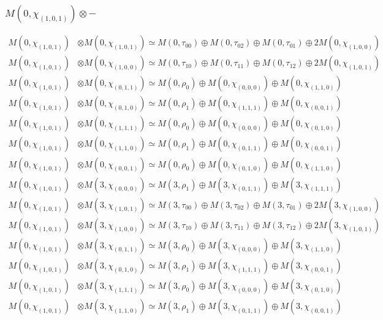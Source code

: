 \subsubsection{$ M(0,\chi_{(1,0,1)})\otimes -$}
\begin{align*}
M(0,\chi_{(1,0,1)}) &\otimes M(0,\chi_{(1,0,1)}) \simeq M(0,\tau_{00}) \oplus M(0,\tau_{02}) \oplus M(0,\tau_{01}) \oplus 2 M(0,\chi_{(1,0,0)})\\
M(0,\chi_{(1,0,1)}) &\otimes M(0,\chi_{(1,0,0)}) \simeq M(0,\tau_{10}) \oplus M(0,\tau_{11}) \oplus M(0,\tau_{12}) \oplus 2 M(0,\chi_{(1,0,1)})\\
M(0,\chi_{(1,0,1)}) &\otimes M(0,\chi_{(0,1,1)}) \simeq M(0,\rho_{0}) \oplus M(0,\chi_{(0,0,0)}) \oplus M(0,\chi_{(1,1,0)})\\
M(0,\chi_{(1,0,1)}) &\otimes M(0,\chi_{(0,1,0)}) \simeq M(0,\rho_{1}) \oplus M(0,\chi_{(1,1,1)}) \oplus M(0,\chi_{(0,0,1)})\\
M(0,\chi_{(1,0,1)}) &\otimes M(0,\chi_{(1,1,1)}) \simeq M(0,\rho_{0}) \oplus M(0,\chi_{(0,0,0)}) \oplus M(0,\chi_{(0,1,0)})\\
M(0,\chi_{(1,0,1)}) &\otimes M(0,\chi_{(1,1,0)}) \simeq M(0,\rho_{1}) \oplus M(0,\chi_{(0,1,1)}) \oplus M(0,\chi_{(0,0,1)})\\
M(0,\chi_{(1,0,1)}) &\otimes M(0,\chi_{(0,0,1)}) \simeq M(0,\rho_{0}) \oplus M(0,\chi_{(0,1,0)}) \oplus M(0,\chi_{(1,1,0)})\\
M(0,\chi_{(1,0,1)}) &\otimes M(3,\chi_{(0,0,0)}) \simeq M(3,\rho_{1}) \oplus M(3,\chi_{(0,1,1)}) \oplus M(3,\chi_{(1,1,1)})\\
M(0,\chi_{(1,0,1)}) &\otimes M(3,\chi_{(1,0,1)}) \simeq M(3,\tau_{00}) \oplus M(3,\tau_{02}) \oplus M(3,\tau_{01}) \oplus 2 M(3,\chi_{(1,0,0)})\\
M(0,\chi_{(1,0,1)}) &\otimes M(3,\chi_{(1,0,0)}) \simeq M(3,\tau_{10}) \oplus M(3,\tau_{11}) \oplus M(3,\tau_{12}) \oplus 2 M(3,\chi_{(1,0,1)})\\
M(0,\chi_{(1,0,1)}) &\otimes M(3,\chi_{(0,1,1)}) \simeq M(3,\rho_{0}) \oplus M(3,\chi_{(0,0,0)}) \oplus M(3,\chi_{(1,1,0)})\\
M(0,\chi_{(1,0,1)}) &\otimes M(3,\chi_{(0,1,0)}) \simeq M(3,\rho_{1}) \oplus M(3,\chi_{(1,1,1)}) \oplus M(3,\chi_{(0,0,1)})\\
M(0,\chi_{(1,0,1)}) &\otimes M(3,\chi_{(1,1,1)}) \simeq M(3,\rho_{0}) \oplus M(3,\chi_{(0,0,0)}) \oplus M(3,\chi_{(0,1,0)})\\
M(0,\chi_{(1,0,1)}) &\otimes M(3,\chi_{(1,1,0)}) \simeq M(3,\rho_{1}) \oplus M(3,\chi_{(0,1,1)}) \oplus M(3,\chi_{(0,0,1)})\\

\end{align*}
